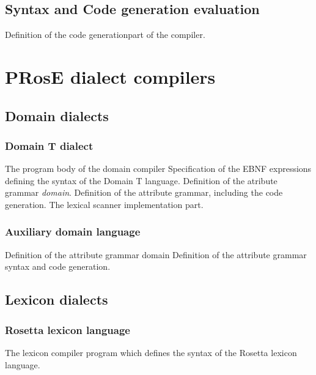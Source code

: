 \subsection{Syntax and Code generation evaluation}
\bsc
{}
 Definition of the code generationpart of the
                            compiler.
\esc

\newpage
\section{{\sf PRosE} dialect compilers}
\subsection{Domain dialects}
\subsubsection{Domain T dialect}
\bsc
{} The program body of the domain compiler
 Specification of the EBNF expressions defining
                             the
                             syntax of the Domain T language.
 Definition of the atribute grammar {\em domain}.
 Definition of the attribute grammar, including the
                          code generation.
 The lexical scanner implementation part.
\esc
\subsubsection{Auxiliary domain language}
\bsc
{} Definition of the attribute grammar domain
 Definition of the attribute grammar syntax and
                                code generation.
\esc
\subsection{Lexicon dialects}
\subsubsection{Rosetta lexicon language}
\bsc
{} The lexicon compiler program which defines the syntax
                          of the Rosetta lexicon language.
\esc

